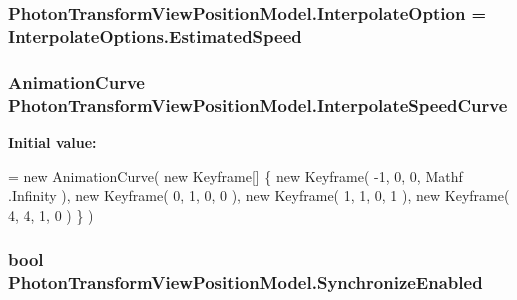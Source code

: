 \subsubsection[{\texorpdfstring{Interpolate\+Option}{InterpolateOption}}]{ Photon\+Transform\+View\+Position\+Model.\+Interpolate\+Option = {\bf Interpolate\+Options.\+Estimated\+Speed}}\hypertarget{class_photon_transform_view_position_model_a333c00379e52fd0327337edb6d918d5f}{}\label{class_photon_transform_view_position_model_a333c00379e52fd0327337edb6d918d5f}
\subsubsection[{\texorpdfstring{Interpolate\+Speed\+Curve}{InterpolateSpeedCurve}}]{\setlength{\rightskip}{0pt plus 5cm}Animation\+Curve Photon\+Transform\+View\+Position\+Model.\+Interpolate\+Speed\+Curve}\hypertarget{class_photon_transform_view_position_model_a3cd4b81cdcb3b099e1514ca7aba02d46}{}\label{class_photon_transform_view_position_model_a3cd4b81cdcb3b099e1514ca7aba02d46}
{\bfseries Initial value\+:}
\begin{DoxyCode}
= \textcolor{keyword}{new} AnimationCurve( \textcolor{keyword}{new} Keyframe[] \{ 
                                                                              \textcolor{keyword}{new} Keyframe( -1, 0, 0, Mathf
      .Infinity ), 
                                                                              \textcolor{keyword}{new} Keyframe( 0, 1, 0, 0 ), 
                                                                              \textcolor{keyword}{new} Keyframe( 1, 1, 0, 1 ), 
                                                                              \textcolor{keyword}{new} Keyframe( 4, 4, 1, 0 ) \} 
      )
\end{DoxyCode}
\subsubsection[{\texorpdfstring{Synchronize\+Enabled}{SynchronizeEnabled}}]{\setlength{\rightskip}{0pt plus 5cm}bool Photon\+Transform\+View\+Position\+Model.\+Synchronize\+Enabled}\hypertarget{class_photon_transform_view_position_model_adf69a879201b7b67af4508ccf795f6ac}{}\label{class_photon_transform_view_position_model_adf69a879201b7b67af4508ccf795f6ac}
